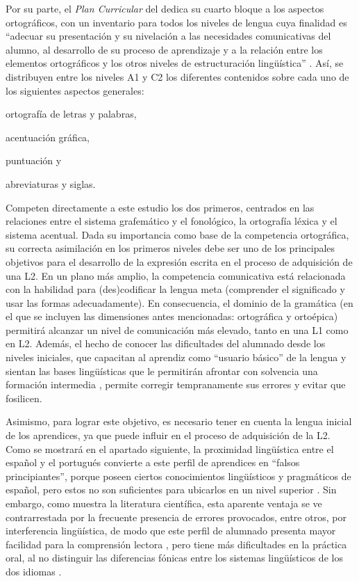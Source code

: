 \documentclass[spanish]{textolivre}
\begin{document}
Por su parte, el \textit{Plan Curricular} del \textcite{instituto_cervantes_plan_2006} dedica su cuarto bloque a los aspectos ortográficos, con un inventario para todos los niveles de lengua cuya finalidad es “adecuar su presentación y su nivelación a las necesidades comunicativas del alumno, al desarrollo de su proceso de aprendizaje y a la relación entre los elementos ortográficos y los otros niveles de estructuración lingüística” \cite{instituto_cervantes_plan_2006}. Así, se distribuyen entre los niveles A1 y C2 los diferentes contenidos sobre cada uno de los siguientes aspectos generales: 
\begin{enumerate*}[label=(\roman*)]
\item ortografía de letras y palabras, 
\item acentuación gráfica, 
\item puntuación y 
\item abreviaturas y siglas. 
\end{enumerate*}
Competen directamente a este estudio los dos primeros, centrados en las relaciones entre el sistema grafemático y el fonológico, la ortografía léxica y el sistema acentual. Dada su importancia como base de la competencia ortográfica, su correcta asimilación en los primeros niveles debe ser uno de los principales objetivos para el desarrollo de la expresión escrita en el proceso de adquisición de una L2. En un plano más amplio, la competencia comunicativa está relacionada con la habilidad para (des)codificar la lengua meta (comprender el significado y usar las formas adecuadamente). En consecuencia, el dominio de la gramática (en el que se incluyen las dimensiones antes mencionadas: ortográfica y ortoépica) permitirá alcanzar un nivel de comunicación más elevado, tanto en una L1 como en L2. Además, el hecho de conocer las dificultades del alumnado desde los niveles iniciales, que capacitan al aprendiz como “usuario básico” de la lengua y sientan las bases lingüísticas que le permitirán afrontar con solvencia una formación intermedia \cite{consejo_de_europa_marco_2001}, permite corregir tempranamente sus errores y evitar que fosilicen.

Asimismo, para lograr este objetivo, es necesario tener en cuenta la lengua inicial de los aprendices, ya que puede influir en el proceso de adquisición de la L2. Como se mostrará en el apartado siguiente, la proximidad lingüística entre el español y el portugués convierte a este perfil de aprendices en “falsos principiantes”, porque poseen ciertos conocimientos lingüísticos y pragmáticos de español, pero estos no son suficientes para ubicarlos en un nivel superior \cite{alvite_importancia_2004}. Sin embargo, como muestra la literatura científica, esta aparente ventaja se ve contrarrestada por la frecuente presencia de errores provocados, entre otros, por interferencia lingüística, de modo que este perfil de alumnado presenta mayor facilidad para la comprensión lectora \cite{Soares_2019}, pero tiene más dificultades en la práctica oral, al no distinguir las diferencias fónicas entre los sistemas lingüísticos de los dos idiomas \cite{buchener_alise_2019,ribeiro_enfoque_2021}.
\end{document}
